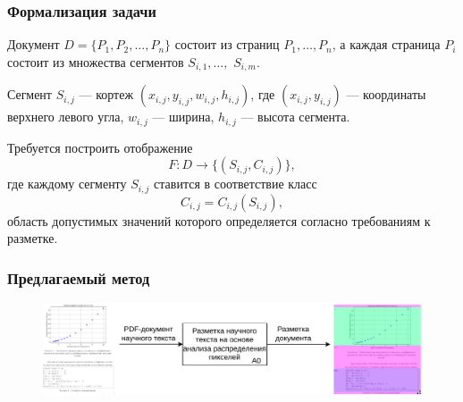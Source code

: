 \documentclass[gray]{beamer}
\begin{document}
\begin{frame}
    \frametitle{Формализация задачи}

    Документ $ D = \{ P_1, P_2, \dots, P_n \} $ состоит из страниц $ P_1, \dots, P_n $, а каждая страница $ P_i $ состоит из множества сегментов $ S_{i,1}, \dots, $ $S_{i,m} $.

    \vspace{0.2cm}

    Сегмент $S_{i,j}$ --- кортеж $(x_{i,j}, y_{i,j}, w_{i,j}, h_{i,j})$, где $(x_{i,j}, y_{i,j})$ --- координаты верхнего левого угла, $w_{i,j}$ --- ширина, $h_{i,j}$ --- высота сегмента.

    \vspace{0.2cm}

    Требуется построить отображение
    $$
        F : D \to \{(S_{i,j}, C_{i,j})\},
    $$
    где каждому сегменту $S_{i,j}$ ставится в соответствие класс
    $$
        C_{i,j} = C_{i,j}(S_{i,j}),
    $$
    область допустимых значений которого определяется согласно требованиям к разметке.
\end{frame}



\begin{frame}
    \frametitle{Предлагаемый метод}
    \begin{figure}[H]
        \begin{center}
            \includegraphics[width=\textwidth]{diag/a0-final.pdf}
        \end{center}
    \end{figure}

\end{frame}
\end{document}
